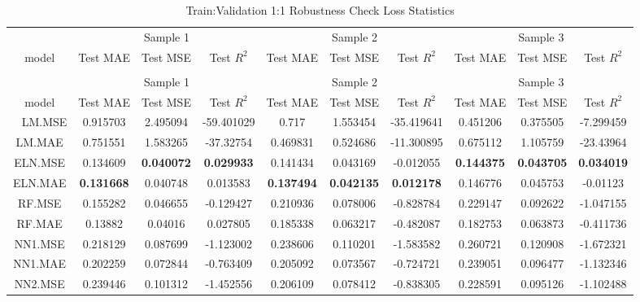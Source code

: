 \begingroup\fontsize{6}{8}\selectfont

\begin{longtable}[t]{cccccccccc}
\caption{\label{tab:}Train:Validation 1:1 Robustness Check Loss Statistics}\\
\toprule
\multicolumn{1}{c}{ } & \multicolumn{3}{c}{Sample 1} & \multicolumn{3}{c}{Sample 2} & \multicolumn{3}{c}{Sample 3} \\
\cmidrule(l{3pt}r{3pt}){2-4} \cmidrule(l{3pt}r{3pt}){5-7} \cmidrule(l{3pt}r{3pt}){8-10}
model & Test MAE & Test MSE & Test $R^2$ & Test MAE & Test MSE & Test $R^2$ & Test MAE & Test MSE & Test $R^2$\\
\midrule
\endfirsthead
\caption[]{Train:Validation 1:1 Robustness Check Loss Statistics }\\
\toprule
\multicolumn{1}{c}{ } & \multicolumn{3}{c}{Sample 1} & \multicolumn{3}{c}{Sample 2} & \multicolumn{3}{c}{Sample 3} \\
\cmidrule(l{3pt}r{3pt}){2-4} \cmidrule(l{3pt}r{3pt}){5-7} \cmidrule(l{3pt}r{3pt}){8-10}
model & Test MAE & Test MSE & Test $R^2$ & Test MAE & Test MSE & Test $R^2$ & Test MAE & Test MSE & Test $R^2$\\
\midrule
\endhead
\
\endfoot
\bottomrule
\endlastfoot
LM.MSE & 0.915703 & 2.495094 & -59.401029 & 0.717 & 1.553454 & -35.419641 & 0.451206 & 0.375505 & -7.299459\\
LM.MAE & 0.751551 & 1.583265 & -37.32754 & 0.469831 & 0.524686 & -11.300895 & 0.675112 & 1.105759 & -23.43964\\
ELN.MSE & 0.134609 & \textbf{0.040072} & \textbf{0.029933} & 0.141434 & 0.043169 & -0.012055 & \textbf{0.144375} & \textbf{0.043705} & \textbf{0.034019}\\
ELN.MAE & \textbf{0.131668} & 0.040748 & 0.013583 & \textbf{0.137494} & \textbf{0.042135} & \textbf{0.012178} & 0.146776 & 0.045753 & -0.01123\\
RF.MSE & 0.155282 & 0.046655 & -0.129427 & 0.210936 & 0.078006 & -0.828784 & 0.229147 & 0.092622 & -1.047155\\
RF.MAE & 0.13882 & 0.04016 & 0.027805 & 0.185338 & 0.063217 & -0.482087 & 0.182753 & 0.063873 & -0.411736\\
NN1.MSE & 0.218129 & 0.087699 & -1.123002 & 0.238606 & 0.110201 & -1.583582 & 0.260721 & 0.120908 & -1.672321\\
NN1.MAE & 0.202259 & 0.072844 & -0.763409 & 0.205092 & 0.073567 & -0.724721 & 0.239051 & 0.096477 & -1.132346\\
NN2.MSE & 0.239446 & 0.101312 & -1.452556 & 0.206109 & 0.078412 & -0.838305 & 0.228591 & 0.095126 & -1.102488\\

\end{longtable}
